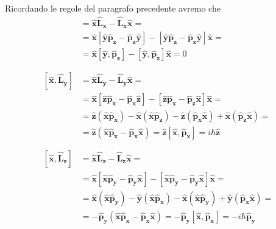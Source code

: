 	
	Ricordando le regole del paragrafo precedente avremo che
		\begin{align}
	[\mathbf{\hat x}, \mathbf{\hat L_x}] {}&= \mathbf{\hat x}\mathbf{\hat L_x} - \mathbf{\hat L_x}\mathbf{\hat x} = \nonumber \\
	&= \mathbf{\hat x}[\mathbf{\hat y} \mathbf{\hat p_z} - \mathbf{\hat p_z} \mathbf{\hat y}] - [\mathbf{\hat y} \mathbf{\hat p_z} - \mathbf{\hat p_z} \mathbf{\hat y}]\mathbf{\hat x}=  \nonumber \\
	&= \mathbf{\hat x}[\mathbf{\hat y} , \mathbf{\hat p_z}] - [\mathbf{\hat y} , \mathbf{\hat p_z}]\mathbf{\hat x}   = 0  \\
\nonumber	\\
\nonumber	\\
			[\mathbf{\hat x}, \mathbf{\hat L_y}] {}&= \mathbf{\hat x}\mathbf{\hat L_y} - \mathbf{\hat L_y}\mathbf{\hat x} = 		 \nonumber \\
		&= \mathbf{\hat x}[\mathbf{\hat z} \mathbf{\hat p_x} - \mathbf{\hat p_x} \mathbf{\hat z}] - [\mathbf{\hat z} \mathbf{\hat p_x} - \mathbf{\hat p_z} \mathbf{\hat x}]\mathbf{\hat x}= 			 \nonumber \\ 
		&= \mathbf{\hat z} (\mathbf{\hat x}\mathbf{\hat p_x})- \mathbf{\hat x}(\mathbf{\hat x}\mathbf{\hat p_z}) - \mathbf{\hat z}(\mathbf{\hat p_x}\mathbf{\hat x}) + \mathbf{\hat x}(\mathbf{\hat p_z}\mathbf{\hat x})= \nonumber \\
		&= \mathbf{\hat z}(\mathbf{\hat x}\mathbf{\hat p_x} - \mathbf{\hat p_x}\mathbf{\hat x}) = \mathbf{\hat z}[\mathbf{\hat x},\mathbf{\hat p_x}]=
		 i \hbar \mathbf{\hat z}\\
\nonumber	\\
\nonumber	\\
		 [\mathbf{\hat x}, \mathbf{\hat L_z}] {}&=  \mathbf{\hat x}\mathbf{\hat L_z} - \mathbf{\hat L_z}\mathbf{\hat x}= \nonumber \\
		&= \mathbf{\hat x}[\mathbf{\hat x}\mathbf{\hat p_y} - \mathbf{\hat p_y}\mathbf{\hat x}] - [\mathbf{\hat x}\mathbf{\hat p_y} - \mathbf{\hat p_y}\mathbf{\hat x}]\mathbf{\hat x}= \nonumber \\
		&= \mathbf{\hat x}(\mathbf{\hat x}\mathbf{\hat p_y}) - \mathbf{\hat y}(\mathbf{\hat x}\mathbf{\hat p_x}) - \mathbf{\hat x}(\mathbf{\hat x}\mathbf{\hat p_y}) + \mathbf{\hat y}(\mathbf{\hat p_x}\mathbf{\hat x})= \nonumber \\
		&= -\mathbf{\hat p_y}(\mathbf{\hat x}\mathbf{\hat p_x} - \mathbf{\hat p_x}\mathbf{\hat x})= -\mathbf{\hat p_y}[\mathbf{\hat x},\mathbf{\hat p_x}]= -i \hbar \mathbf{\hat p_y}
		\end{align}

